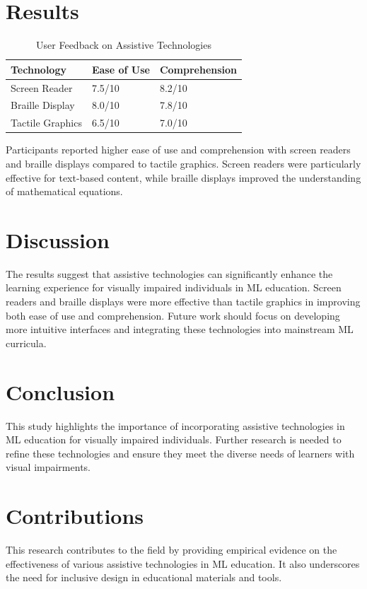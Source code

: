 \documentclass{article}
\begin{document}
\section{Results}
\begin{table}[ht]
\centering
\begin{tabularx}{\linewidth}{|X|X|X|}
\hline
\textbf{Technology} & \textbf{Ease of Use} & \textbf{Comprehension} \\
\hline
Screen Reader & 7.5/10 & 8.2/10 \\
Braille Display & 8.0/10 & 7.8/10 \\
Tactile Graphics & 6.5/10 & 7.0/10 \\
\hline
\end{tabularx}
\caption{User Feedback on Assistive Technologies}
\label{tab:user_feedback}
\end{table}

Participants reported higher ease of use and comprehension with screen readers and braille displays compared to tactile graphics. Screen readers were particularly effective for text-based content, while braille displays improved the understanding of mathematical equations.

\section{Discussion}
The results suggest that assistive technologies can significantly enhance the learning experience for visually impaired individuals in ML education. Screen readers and braille displays were more effective than tactile graphics in improving both ease of use and comprehension. Future work should focus on developing more intuitive interfaces and integrating these technologies into mainstream ML curricula.

\section{Conclusion}
This study highlights the importance of incorporating assistive technologies in ML education for visually impaired individuals. Further research is needed to refine these technologies and ensure they meet the diverse needs of learners with visual impairments.

\section{Contributions}
This research contributes to the field by providing empirical evidence on the effectiveness of various assistive technologies in ML education. It also underscores the need for inclusive design in educational materials and tools.



\end{document}
